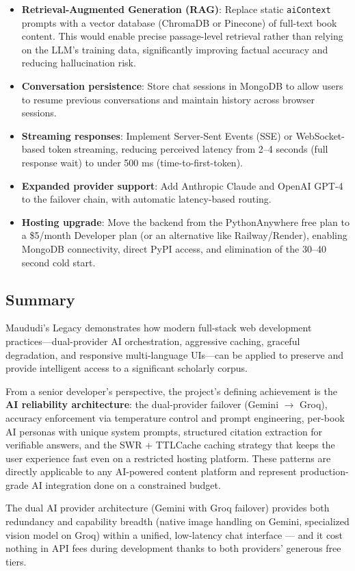 \documentclass[11pt,a4paper]{article}
\begin{document}
\begin{itemize}
    \item \textbf{Retrieval-Augmented Generation (RAG)}: Replace static \texttt{aiContext} prompts with a vector database (ChromaDB or Pinecone) of full-text book content. This would enable precise passage-level retrieval rather than relying on the LLM's training data, significantly improving factual accuracy and reducing hallucination risk.
 
    \item \textbf{Conversation persistence}: Store chat sessions in MongoDB to allow users to resume previous conversations and maintain history across browser sessions.
 
    \item \textbf{Streaming responses}: Implement Server-Sent Events (SSE) or WebSocket-based token streaming, reducing perceived latency from 2--4 seconds (full response wait) to under 500 ms (time-to-first-token).
 
    \item \textbf{Expanded provider support}: Add Anthropic Claude and OpenAI GPT-4 to the failover chain, with automatic latency-based routing.
 
    \item \textbf{Hosting upgrade}: Move the backend from the PythonAnywhere free plan to a \$5/month Developer plan (or an alternative like Railway/Render), enabling MongoDB connectivity, direct PyPI access, and elimination of the 30--40 second cold start.
\end{itemize}
 
\subsection{Summary}
 
Maududi's Legacy demonstrates how modern full-stack web development practices---dual-provider AI orchestration, aggressive caching, graceful degradation, and responsive multi-language UIs---can be applied to preserve and provide intelligent access to a significant scholarly corpus. 
 
From a senior developer's perspective, the project's defining achievement is the \textbf{AI reliability architecture}: the dual-provider failover (Gemini $\rightarrow$ Groq), accuracy enforcement via temperature control and prompt engineering, per-book AI personas with unique system prompts, structured citation extraction for verifiable answers, and the SWR + TTLCache caching strategy that keeps the user experience fast even on a restricted hosting platform. These patterns are directly applicable to any AI-powered content platform and represent production-grade AI integration done on a constrained budget.
 
The dual AI provider architecture (Gemini with Groq failover) provides both redundancy and capability breadth (native image handling on Gemini, specialized vision model on Groq) within a unified, low-latency chat interface --- and it cost nothing in API fees during development thanks to both providers' generous free tiers.
 
\end{document}
